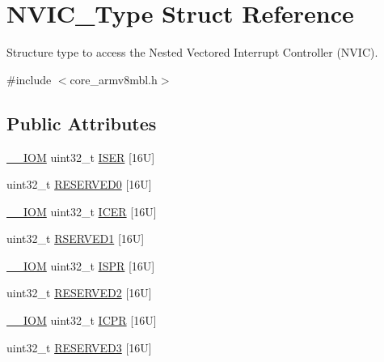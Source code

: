 \hypertarget{struct_n_v_i_c___type}{}\section{N\+V\+I\+C\+\_\+\+Type Struct Reference}
\label{struct_n_v_i_c___type}


Structure type to access the Nested Vectored Interrupt Controller (N\+V\+IC).  




{\ttfamily \#include $<$core\+\_\+armv8mbl.\+h$>$}

\subsection*{Public Attributes}
\begin{DoxyCompactItemize}
\item 
\hyperlink{core__sc300_8h_ab6caba5853a60a17e8e04499b52bf691}{\+\_\+\+\_\+\+I\+OM} uint32\+\_\+t \hyperlink{struct_n_v_i_c___type_a06726c729c5557701defc4d6b5d8f9f6}{I\+S\+ER} \mbox{[}16\+U\mbox{]}
\item 
uint32\+\_\+t \hyperlink{struct_n_v_i_c___type_a114b23ee6f1540603908adaedaecc477}{R\+E\+S\+E\+R\+V\+E\+D0} \mbox{[}16\+U\mbox{]}
\item 
\hyperlink{core__sc300_8h_ab6caba5853a60a17e8e04499b52bf691}{\+\_\+\+\_\+\+I\+OM} uint32\+\_\+t \hyperlink{struct_n_v_i_c___type_aed882e10ea8ee6a915007af71643d7da}{I\+C\+ER} \mbox{[}16\+U\mbox{]}
\item 
uint32\+\_\+t \hyperlink{struct_n_v_i_c___type_adb1d396e2b2209db1e9a45dd2ed27ca3}{R\+S\+E\+R\+V\+E\+D1} \mbox{[}16\+U\mbox{]}
\item 
\hyperlink{core__sc300_8h_ab6caba5853a60a17e8e04499b52bf691}{\+\_\+\+\_\+\+I\+OM} uint32\+\_\+t \hyperlink{struct_n_v_i_c___type_a288bc5e8b844a531a6ecdcc8dbcb8050}{I\+S\+PR} \mbox{[}16\+U\mbox{]}
\item 
uint32\+\_\+t \hyperlink{struct_n_v_i_c___type_a8ed6bf06e09e4ebc57e591fde22c70c3}{R\+E\+S\+E\+R\+V\+E\+D2} \mbox{[}16\+U\mbox{]}
\item 
\hyperlink{core__sc300_8h_ab6caba5853a60a17e8e04499b52bf691}{\+\_\+\+\_\+\+I\+OM} uint32\+\_\+t \hyperlink{struct_n_v_i_c___type_aa056e3f59e88845ee47db4a43635b3a2}{I\+C\+PR} \mbox{[}16\+U\mbox{]}
\item 
uint32\+\_\+t \hyperlink{struct_n_v_i_c___type_a33fe3d6f15f4d638ac6a10a370e6f8ed}{R\+E\+S\+E\+R\+V\+E\+D3} \mbox{[}16\+U\mbox{]}
\item 

\end{DoxyCompactItemize}
